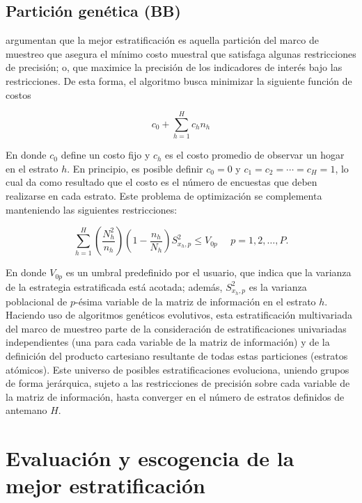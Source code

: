 \documentclass[
  12pt,
]{book}
\begin{document}
\hypertarget{particiuxf3n-genuxe9tica-bb}{%
\subsection{Partición genética (BB)}\label{particiuxf3n-genuxe9tica-bb}}

\citet{Ballin_Barcaroli_2013} argumentan que la mejor estratificación es aquella partición del marco de muestreo que asegura el mínimo costo muestral que satisfaga algunas restricciones de precisión; o, que maximice la precisión de los indicadores de interés bajo las restricciones. De esta forma, el algoritmo busca minimizar la siguiente función de costos

\[
c_0 + \sum_{h=1}^{H} c_h n_h
\]

En donde \(c_0\) define un costo fijo y \(c_h\) es el costo promedio de observar un hogar en el estrato \(h\). En principio, es posible definir \(c_0=0\) y \(c_1 = c_2 = \cdots = c_H = 1\), lo cual da como resultado que el costo es el número de encuestas que deben realizarse en cada estrato. Este problema de optimización se complementa manteniendo las siguientes restricciones:

\[
\sum_{h=1}^{H} \left(\frac{N_h^2}{n_h}\right)\left(1-\frac{n_h}{N_h}\right) S^2_{x_h,p} \leq V_{0p}\ \ \  \ \ \ p = 1, 2, \ldots, P.
\]

En donde \(V_{0p}\) es un umbral predefinido por el usuario, que indica que la varianza de la estrategia estratificada está acotada; además, \(S^2_{x_h,p}\) es la varianza poblacional de \(p\)-ésima variable de la matriz de información en el estrato \(h\).
Haciendo uso de algoritmos genéticos evolutivos, esta estratificación multivariada del marco de muestreo parte de la consideración de estratificaciones univariadas independientes (una para cada variable de la matriz de información) y de la definición del producto cartesiano resultante de todas estas particiones (estratos atómicos). Este universo de posibles estratificaciones evoluciona, uniendo grupos de forma jerárquica, sujeto a las restricciones de precisión sobre cada variable de la matriz de información, hasta converger en el número de estratos definidos de antemano \(H\).

\hypertarget{evaluaciuxf3n-y-escogencia-de-la-mejor-estratificaciuxf3n}{%
\section{Evaluación y escogencia de la mejor estratificación}\label{evaluaciuxf3n-y-escogencia-de-la-mejor-estratificaciuxf3n}}
\end{document}
